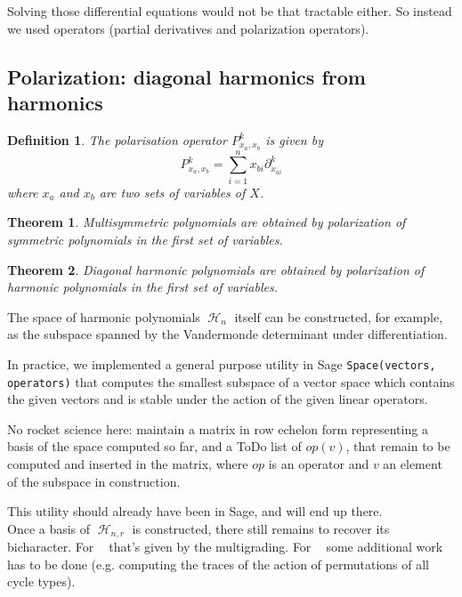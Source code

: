 \documentclass[letter,12pt]{article}
\newcommand{\nicolas}[1]{\todo[linecolor=green,backgroundcolor=green!25,bordercolor=green]{#1}}
\DeclareMathOperator{\Sn}{\mathbb{S}_n}
\DeclareMathOperator{\GLr}{GL_r}
\DeclareMathOperator{\harmonics}{\mathcal{H}}
\newtheorem{theorem}{Theorem}
\newtheorem{definition}{Definition}
\begin{document}
	Solving those differential equations would not be that tractable either. So instead we used operators (partial derivatives and polarization operators).
	
	
	\subsection{Polarization: diagonal harmonics from harmonics}
		
	\begin{definition}
		The \emph{polarisation operator} $P_{x_a,x_b}^k$ is given by
		$$P_{x_a,x_b}^k = \sum_{i=1}^{n} x_{bi} \partial_{x_{ai}}^k$$
		where $x_a$ and $x_b$ are two sets of variables of $X$. 
	\end{definition}
	
	\begin{theorem}
		Multisymmetric polynomials are obtained by polarization of symmetric polynomials in the first set of variables.
	\end{theorem}
	
	\begin{theorem}
		Diagonal harmonic polynomials are obtained by polarization of harmonic polynomials in the first set of variables.
	\end{theorem}
	
	The space of harmonic polynomials $\harmonics_n$ itself can be constructed, for example, as the subspace spanned by the Vandermonde determinant under differentiation.
	
	In practice, we implemented a general purpose utility in Sage \texttt{Space(vectors, operators)} that computes the smallest subspace of a vector space which contains the given vectors and is stable under the action of the given linear operators.
	\nicolas{put an example here}
	
	No rocket science here: maintain a matrix in row echelon form representing a basis of the space computed so far, and a ToDo list of $op(v)$, that remain to be computed and inserted in the matrix, where $op$ is an operator and $v$ an element of the subspace in construction.
	
	This utility should already have been in Sage, and will end up there. \\
	
	Once a basis of $\harmonics_{n,r}$ is constructed, there still remains to recover its bicharacter. For $\GLr$ that's given by the multigrading. For $\Sn$ some additional work has to be done (e.g. computing the traces of the action of permutations of all cycle types).
	
\end{document}
